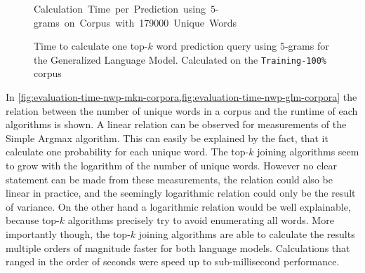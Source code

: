 \begin{figure}[p!]
  \small
  \vspace{-3ex}
  \begin{center}
    \mbox{\hspace{-0.8cm}Calculation Time per Prediction using $5$-grams on Corpus with \num{179000} Unique Words}
  \end{center}

  \vspace{-0.2cm}
  \hspace{-0.16\textwidth}
  \normalsize
  \caption{Time to calculate one top-$k$ word prediction query using $5$-grams
    for the Generalized Language Model. Calculated on the
    \texttt{Training-100\%} corpus}
  \label{fig:evaluation-time-nwp-glm-predictions}
\end{figure}

In \cref{fig:evaluation-time-nwp-mkn-corpora,fig:evaluation-time-nwp-glm-corpora}
the relation between the number of unique words in a corpus and the runtime of
each algorithms is shown.
A linear relation can be observed for measurements of the Simple Argmax
algorithm.
This can easily be explained by the fact, that it calculate one probability for
each unique word.
The top-$k$ joining algorithms seem to grow with the logarithm of the number of
unique words.
However no clear statement can be made from these measurements, the relation
could also be linear in practice, and the seemingly logarithmic relation could
only be the result of variance.
On the other hand a logarithmic relation would be well explainable, because
top-$k$ algorithms precisely try to avoid enumerating all words.
More importantly though, the top-$k$ joining algorithms are able to calculate
the results multiple orders of magnitude faster for both language models.
Calculations that ranged in the order of seconds were speed up to
sub-millisecond performance.

